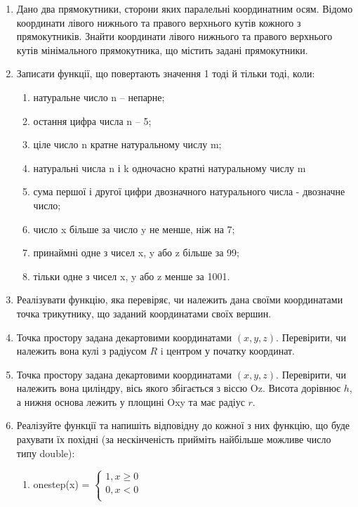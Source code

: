 \documentclass[]{article}
\makeatletter
\newcommand{\xslalph}[1]{\expandafter\@xslalph\csname c@#1\endcsname}
\newcommand{\@xslalph}[1]{%
    \ifcase#1\or а\or б\or в\or г\or д\or e\or є\or ж\or з\or i%
    \or й\or к\or л\or м\or н\or о\or п\or р\or с\or т%
    \or у\or ф\or х\or ц\or ч\or ш\or ю\or я\or аа\or бб\or вв %
    \else\@ctrerr\fi%
}
\makeatother
\begin{document}
\begin{enumerate}
\item
  Дано два прямокутники, сторони яких паралельні координатним осям.
  Відомо координати лівого нижнього та правого верхнього кутів кожного з
  прямокутників. Знайти координати лівого нижнього та правого верхнього
  кутів мінімального прямокутника, що містить задані прямокутники.
\item
  Записати функції, що повертають значення 1 тоді й тільки тоді, коли:
\begin{enumerate}[label=\xslalph*)]
\item натуральне число n -- непарне;
\item остання цифра числа n -- 5;
\item ціле число n кратне натуральному числу m;
\item натуральні числа n і k одночасно кратні натуральному числу m
\item сума першої і другої цифри двозначного натурального числа - двозначне
число;
\item число x більше за число y не менше, ніж на 7;
\item принаймні одне з чисел x, y або z більше за 99;
\item тільки одне з чисел x, y або z менше за 1001.
\end{enumerate}

\item
  Реалізувати функцію, яка перевіряє, чи належить дана своїми координатами
 точка трикутнику, що заданий координатами своїх вершин.
\item
  Точка простору задана декартовими координатами $(x, y, z)$. Перевірити,
  чи належить вона кулі з радіусом $R$ i центром у початку координат.
\item
  Точка простору задана декартовими координатами $(x, y, z)$. Перевірити,
  чи належить вона циліндру, вісь якого збігається з віссю Oz. Висота
  дорівнює $h$, а нижня основа лежить у площині Oxy та має радіус $r$.
\item
  Реалізуйте функції та напишіть відповідну до кожної з них функцію, що
  буде рахувати їх похідні (за нескінченість прийміть найбільше можливе 
число типу double):
\begin{enumerate}[label=\xslalph*)]
\item onestep(x) = \(\left\{ \begin{matrix}
1,x \geq 0 \\
0,x < 0 \\
\end{matrix} \right.\ \)


\end{enumerate}
\end{enumerate}
\end{document}
